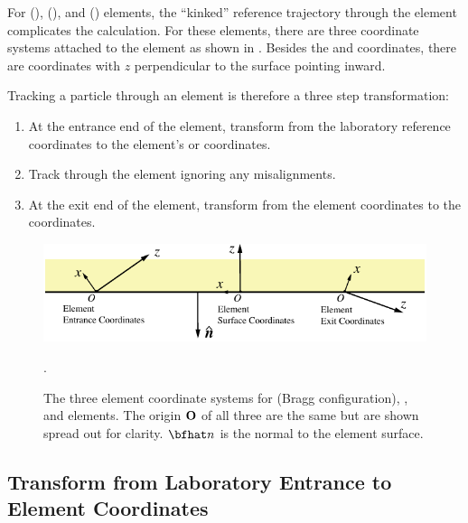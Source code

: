 For  (),  (), and 
() elements, the ``kinked'' reference trajectory through the element complicates
the calculation. For these elements, there are three coordinate systems attached to the element as
shown in . Besides the  and 
coordinates, there are  coordinates with $z$ perpendicular to the surface
pointing inward.

Tracking a particle through an element is therefore a three
step transformation:
\begin{enumerate}[itemsep=-0.1ex, topsep=-0.4ex]
\item
At the entrance end of the element, transform from the laboratory
reference coordinates to the element's  or 
coordinates.
\item
Track through the element ignoring any misalignments.
\item
At the exit end of the element, transform from the element coordinates
to the   coordinates.
\end{enumerate}



\begin{figure}[tb]
  \centering
  \includegraphics[width=5in]{photon-ele-coords.pdf}
  \caption[Crystal, Mirror, and Multilayer_Mirror Element Coordinates.]
{The three element coordinate systems for  (Bragg
configuration), , and  elements.  The
origin ${\bf O}$ of all three are the same but are shown spread out for
clarity.  $\bfhat n$ is the normal to the element surface.}
  \label{f:photon.ele.coords}.
\end{figure}

\subsection{Transform from Laboratory Entrance to Element Coordinates}

